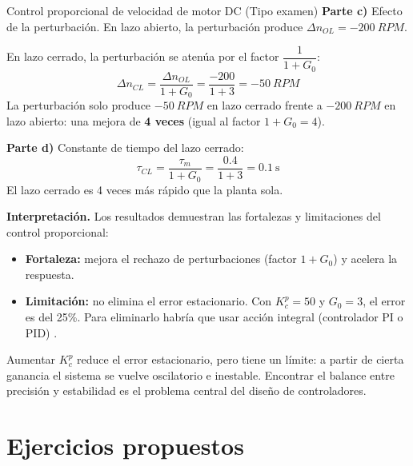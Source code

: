 \begin{ejercicioresuelto}{Control proporcional de velocidad de motor DC (Tipo examen)}
\textbf{Parte c)} Efecto de la perturbación. En lazo abierto, la perturbación
produce $\Delta n_{OL} = \SI{-200}{RPM}$.

En lazo cerrado, la perturbación se atenúa por el factor $\dfrac{1}{1 + G_0}$:
\begin{equation*}
  \Delta n_{CL} = \frac{\Delta n_{OL}}{1 + G_0} = \frac{-200}{1 + 3}
  = \SI{-50}{RPM}
\end{equation*}
La perturbación solo produce $\SI{-50}{RPM}$ en lazo cerrado frente a
$\SI{-200}{RPM}$ en lazo abierto: una mejora de \textbf{4 veces} (igual al
factor $1 + G_0 = 4$).

\textbf{Parte d)} Constante de tiempo del lazo cerrado:
\begin{equation*}
  \tau_{CL} = \frac{\tau_m}{1 + G_0} = \frac{0.4}{1 + 3} = \SI{0.1}{\second}
\end{equation*}
El lazo cerrado es 4 veces más rápido que la planta sola.

\textbf{Interpretación.} Los resultados demuestran las fortalezas y limitaciones
del control proporcional:
\begin{itemize}
  \item \textbf{Fortaleza:} mejora el rechazo de perturbaciones (factor $1 + G_0$)
    y acelera la respuesta.
  \item \textbf{Limitación:} no elimina el error estacionario. Con $K_c^p = 50$
    y $G_0 = 3$, el error es del 25\%. Para eliminarlo habría que usar acción
    integral (controlador PI o PID) .
\end{itemize}
Aumentar $K_c^p$ reduce el error estacionario, pero tiene un límite: a partir de
cierta ganancia el sistema se vuelve oscilatorio e inestable. Encontrar el
balance entre precisión y estabilidad es el problema central del diseño de
controladores.
\end{ejercicioresuelto}

\section{Ejercicios propuestos}
\label{sec:intro-propuestos}


